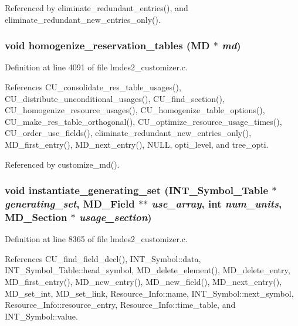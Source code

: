 Referenced by eliminate\_\-redundant\_\-entries(), and eliminate\_\-redundant\_\-new\_\-entries\_\-only().
\subsubsection{\setlength{\rightskip}{0pt plus 5cm}void homogenize\_\-reservation\_\-tables (\bf{MD} $\ast$ {\em md})}\label{lmdes2__customizer_8c_3f2c2ef62b99bf93eba2656e2f742c67}




Definition at line 4091 of file lmdes2\_\-customizer.c.

References CU\_\-consolidate\_\-res\_\-table\_\-usages(), CU\_\-distribute\_\-unconditional\_\-usages(), CU\_\-find\_\-section(), CU\_\-homogenize\_\-resource\_\-usages(), CU\_\-homogenize\_\-table\_\-options(), CU\_\-make\_\-res\_\-table\_\-orthogonal(), CU\_\-optimize\_\-resource\_\-usage\_\-times(), CU\_\-order\_\-use\_\-fields(), eliminate\_\-redundant\_\-new\_\-entries\_\-only(), MD\_\-first\_\-entry(), MD\_\-next\_\-entry(), NULL, opti\_\-level, and tree\_\-opti.

Referenced by customize\_\-md().
\subsubsection{\setlength{\rightskip}{0pt plus 5cm}void instantiate\_\-generating\_\-set (\bf{INT\_\-Symbol\_\-Table} $\ast$ {\em generating\_\-set}, \bf{MD\_\-Field} $\ast$$\ast$ {\em use\_\-array}, int {\em num\_\-units}, \bf{MD\_\-Section} $\ast$ {\em usage\_\-section})}\label{lmdes2__customizer_8c_9e2ad332512f8a39005bb239d100eef6}




Definition at line 8365 of file lmdes2\_\-customizer.c.

References CU\_\-find\_\-field\_\-decl(), INT\_\-Symbol::data, INT\_\-Symbol\_\-Table::head\_\-symbol, MD\_\-delete\_\-element(), MD\_\-delete\_\-entry, MD\_\-first\_\-entry(), MD\_\-new\_\-entry(), MD\_\-new\_\-field(), MD\_\-next\_\-entry(), MD\_\-set\_\-int, MD\_\-set\_\-link, Resource\_\-Info::name, INT\_\-Symbol::next\_\-symbol, Resource\_\-Info::resource\_\-entry, Resource\_\-Info::time\_\-table, and INT\_\-Symbol::value.


